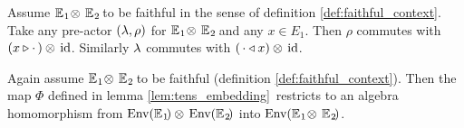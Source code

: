 \begin{lemma_sec} \label{lem:action_of_xtens1}
Assume\/ $\mathbb{E}_{\hspace{0.5pt}1}\! \otimes\, \mathbb{E}_{\hspace{0.5pt}2}\!$ to be faithful in the sense of
definition \ref{def:faithful_context}\@.
Take any pre-actor $(\lambda,\rho)$ for $\mathbb{E}_{\hspace{0.5pt}1}\! \otimes\, \mathbb{E}_{\hspace{0.5pt}2}\!$ and any\/ $x \in E_1$.
Then\/ $\rho$ commutes with $\vertM (x \lact \cdot\,) \tens\, \id$.
Similarly\/ $\lambda$ commutes with $(\,\cdot \triangleleft x) \otimes\, \mbox{\rm id}$.
\end{lemma_sec}

\begin{prop_sec}  \label{prop:tensor_embedding_Env}
Again assume\/ $\mathbb{E}_{\hspace{0.5pt}1}\! \otimes\, \mathbb{E}_{\hspace{0.5pt}2}\!$ to be faithful
(definition \ref{def:faithful_context}).
Then the map\/ $\Phi$ defined in lemma \ref{lem:tens_embedding}\ restricts
to an algebra homomorphism from\/ $\mbox{\rm Env}(\mathbb{E}_{\hspace{0.5pt}1}\!) \otimes\, \mbox{\rm Env}(\mathbb{E}_{\hspace{0.5pt}2}\!)$
into\/ $\mbox{\rm Env}(\mathbb{E}_{\hspace{0.5pt}1}\! \otimes\, \mathbb{E}_{\hspace{0.5pt}2}\!)$\@.
\end{prop_sec}
